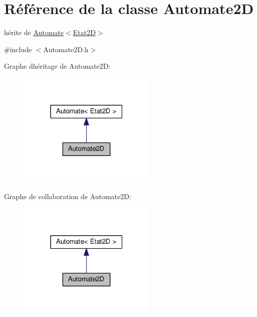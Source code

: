 \hypertarget{class_automate2_d}{}\section{Référence de la classe Automate2D}
\label{class_automate2_d}


hérite de \hyperlink{class_automate}{Automate$<$\+Etat2\+D$>$}  




{\ttfamily \#include $<$Automate2\+D.\+h$>$}



Graphe d\textquotesingle{}héritage de Automate2D\+:\nopagebreak
\begin{figure}[H]
\begin{center}
\leavevmode
\includegraphics[width=187pt]{class_automate2_d__inherit__graph}
\end{center}
\end{figure}


Graphe de collaboration de Automate2D\+:\nopagebreak
\begin{figure}[H]
\begin{center}
\leavevmode
\includegraphics[width=187pt]{class_automate2_d__coll__graph}
\end{center}
\end{figure}
